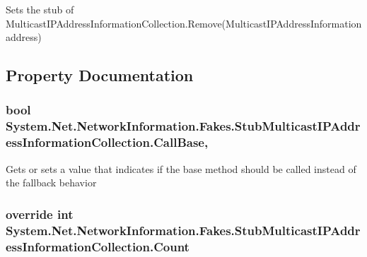 Sets the stub of Multicast\-I\-P\-Address\-Information\-Collection.\-Remove(\-Multicast\-I\-P\-Address\-Information address)



\subsection{Property Documentation}
\hypertarget{class_system_1_1_net_1_1_network_information_1_1_fakes_1_1_stub_multicast_i_p_address_information_collection_aa63e5841b72548c7125c75aeb75bf42f}{
\subsubsection[{Call\-Base}]{\setlength{\rightskip}{0pt plus 5cm}bool System.\-Net.\-Network\-Information.\-Fakes.\-Stub\-Multicast\-I\-P\-Address\-Information\-Collection.\-Call\-Base\hspace{0.3cm}{\ttfamily [get]}, {\ttfamily [set]}}}\label{class_system_1_1_net_1_1_network_information_1_1_fakes_1_1_stub_multicast_i_p_address_information_collection_aa63e5841b72548c7125c75aeb75bf42f}


Gets or sets a value that indicates if the base method should be called instead of the fallback behavior

\hypertarget{class_system_1_1_net_1_1_network_information_1_1_fakes_1_1_stub_multicast_i_p_address_information_collection_a4317fee9461661d380ea78c03bc1d53a}{
\subsubsection[{Count}]{\setlength{\rightskip}{0pt plus 5cm}override int System.\-Net.\-Network\-Information.\-Fakes.\-Stub\-Multicast\-I\-P\-Address\-Information\-Collection.\-Count\hspace{0.3cm}{\ttfamily [get]}}}\label{class_system_1_1_net_1_1_network_information_1_1_fakes_1_1_stub_multicast_i_p_address_information_collection_a4317fee9461661d380ea78c03bc1d53a}


